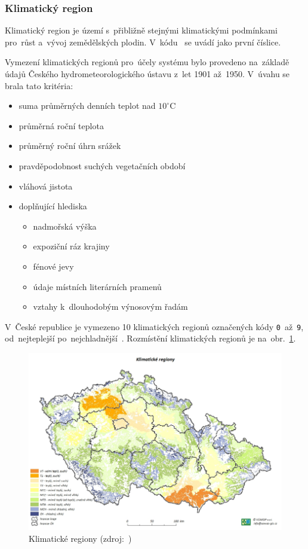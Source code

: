 \subsubsection{Klimatický region}
\label{klimaticky_region}

Klimatický region je území s~přibližně stejnými klimatickými
podmínkami pro~růst a~vývoj zemědělských plodin. V~kódu~ se
uvádí jako první číslice.

Vymezení klimatických regionů pro~účely systému  bylo
provedeno na~zá\-kladě údajů Českého hydrometeorologického ústavu
z~let 1901 až~1950. V~úvahu se brala tato kritéria:
	\begin{itemize}[leftmargin=1.5cm, noitemsep]
		\item suma průměrných denních teplot nad $10^\circ$C
		\item průměrná roční teplota
		\item průměrný roční úhrn srážek
		\item pravděpodobnost suchých vegetačních období
		\item vláhová jistota
		\item doplňující hlediska
			\begin{itemize}[leftmargin=1cm, noitemsep]
				\item nadmořská výška
				\item expoziční ráz krajiny
				\item fénové jevy
				\item údaje místních literárních
pramenů
				\item vztahy k~dlouhodobým výnosovým
řadám
			\end{itemize}
	\end{itemize}

V~České republice je vymezeno 10 klimatických regionů označených kódy
\texttt{0}~až~\texttt{9}, od~nejteplejší
po~nejchladnější~\citep{vyhlaska_327}. Rozmístění klimatických regionů
je na~obr.~\ref{fig:klimaticke_regiony}.

	\begin{figure}[H] \centering
		\includegraphics[width=.9\textwidth]{./pictures/klimaticky_region.png}
		\caption[Klimatické regiony]{Klimatické regiony
(zdroj:~\citep{vumop_bpej})}
		\label{fig:klimaticke_regiony}
 	\end{figure}

